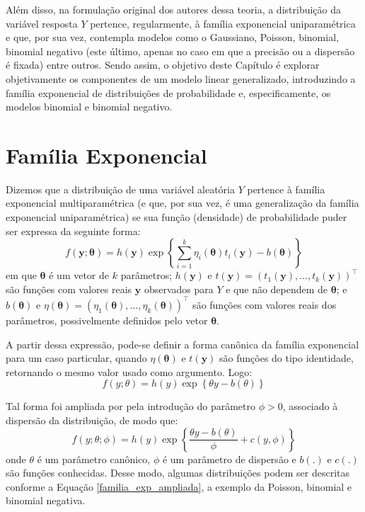 \documentclass[12pt, a4paper, twoside]{report}
\numberwithin{equation}{section} %
\begin{document}
Além disso, na formulação original dos autores dessa teoria, a distribuição da variável resposta $Y$ pertence, regularmente, à família exponencial uniparamétrica e que, por sua vez, contempla modelos como o Gaussiano, Poisson, binomial, binomial negativo (este último, apenas no caso em que a precisão ou a dispersão é fixada) entre outros. Sendo assim, o objetivo deste Capítulo é explorar objetivamente os componentes de um modelo linear generalizado, introduzindo a família exponencial de distribuições de probabilidade e, especificamente, os modelos binomial e binomial negativo.

\section{Família Exponencial}
Dizemos que a distribuição de uma variável aleatória $Y$ pertence à família exponencial multiparamétrica (e que, por sua vez, é uma generalização da família exponencial uniparamétrica) se sua função (densidade) de probabilidade puder ser expressa da seguinte forma: 
\begin{equation}
    f(\boldsymbol{y};\boldsymbol{\theta}) = h(\boldsymbol{y}) \exp \left\{ \sum_{i=1}^k\eta_{i}(\boldsymbol{\theta})t_{i}(\boldsymbol{y})-b(\boldsymbol{\theta}) \right\}
\end{equation}
em que $\boldsymbol{\theta}$ é um vetor de $k$ parâmetros; $h(\boldsymbol{y})$ e $t(\boldsymbol{y})=(t_{1}(\boldsymbol{y}),...,t_{k}(\boldsymbol{y}))^\top$ são funções com valores reais $\boldsymbol{y}$ observados para $Y$ e que não dependem de $\boldsymbol{\theta}$; e $b(\boldsymbol{\theta})$ e $\eta(\boldsymbol{\theta})=(\eta_{1}(\boldsymbol{\theta}),...,\eta_{k}(\boldsymbol{\theta}))^\top$ são funções com valores reais dos parâmetros, possivelmente definidos pelo vetor $\boldsymbol{\theta}$.

A partir dessa expressão, pode-se definir a forma canônica da família exponencial para um caso particular, quando $\eta(\boldsymbol{\theta})$ e $t(\boldsymbol{y})$ são funções do tipo identidade, retornando o mesmo valor usado como argumento. Logo: 
\begin{equation}
    f(y;\theta) = h(y) \exp \left\{\theta y - b(\theta) \right\}
\end{equation}

Tal forma foi ampliada por \cite{nelder1972generalized} pela introdução do parâmetro $\phi > 0$, associado à dispersão da distribuição, de modo que:
\begin{equation}
    f(y;\theta;\phi) = h(y) \exp \left\{\frac{\theta y - b(\theta)}{\phi} + c(y,\phi) \right\}
    \label{familia_exp_ampliada}
\end{equation}
onde $\theta$ é um parâmetro canônico, $\phi$ é um parâmetro de dispersão e $b(.)$ e $c(.)$ são funções conhecidas. Desse modo, algumas distribuições podem ser descritas conforme a Equação \ref{familia_exp_ampliada}, a exemplo da Poisson, binomial e binomial negativa.
\end{document}
